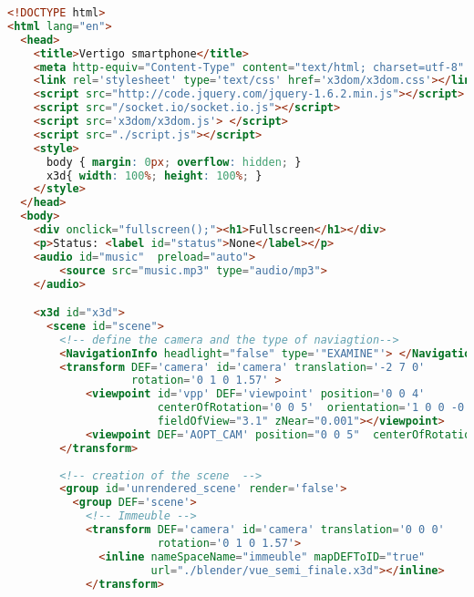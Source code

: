 \lstset{style=mystyle}
\begin{lstlisting}[language=Html]
<!DOCTYPE html>
<html lang="en">
  <head>
    <title>Vertigo smartphone</title>
    <meta http-equiv="Content-Type" content="text/html; charset=utf-8" />
    <link rel='stylesheet' type='text/css' href='x3dom/x3dom.css'></link>
    <script src="http://code.jquery.com/jquery-1.6.2.min.js"></script>
    <script src="/socket.io/socket.io.js"></script>
    <script src='x3dom/x3dom.js'> </script>
    <script src="./script.js"></script>
    <style>
      body { margin: 0px; overflow: hidden; }
      x3d{ width: 100%; height: 100%; }
    </style>
  </head>
  <body>
    <div onclick="fullscreen();"><h1>Fullscreen</h1></div>
    <p>Status: <label id="status">None</label></p>
    <audio id="music"  preload="auto">
    	<source src="music.mp3" type="audio/mp3">
    </audio>

    <x3d id="x3d">
      <scene id="scene">  
        <!-- define the camera and the type of naviagtion-->
        <NavigationInfo headlight="false" type='"EXAMINE"'> </NavigationInfo>
        <transform DEF='camera' id='camera' translation='-2 7 0' 
        		   rotation='0 1 0 1.57' >
        	<viewpoint id='vpp' DEF='viewpoint' position='0 0 4' 
        			   centerOfRotation='0 0 5'  orientation='1 0 0 -0.2' 
        			   fieldOfView="3.1" zNear="0.001"></viewpoint>
          	<viewpoint DEF='AOPT_CAM' position="0 0 5"  centerOfRotation="0 0 5"/>
        </transform>
  
        <!-- creation of the scene  -->
        <group id='unrendered_scene' render='false'>
          <group DEF='scene'>
            <!-- Immeuble -->
            <transform DEF='camera' id='camera' translation='0 0 0' 
            		   rotation='0 1 0 1.57'>
              <inline nameSpaceName="immeuble" mapDEFToID="true" 
              		  url="./blender/vue_semi_finale.x3d"></inline>
            </transform>


\end{lstlisting}
